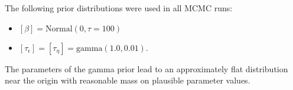 \documentclass[12pt,fleqn]{article}
\begin{document}
\begin{flushleft}
The following prior distributions were used in all MCMC runs:
\begin{itemize}
  \item $[\beta] = \textrm{Normal}(0,\tau=100)$
  \item $[\tau_\epsilon]=[\tau_\eta]=\textrm{gamma}(1.0,0.01)$.
\end{itemize}
The parameters of the gamma prior lead to an approximately flat distribution near the origin with reasonable mass on plausible parameter values.

\renewcommand{\refname}{Literature Cited}
% 



\end{flushleft}
\end{document}
